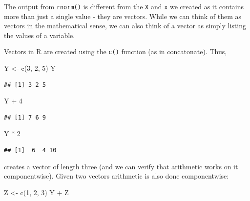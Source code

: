 \documentclass[
]{book}
\newenvironment{Shaded}{\begin{snugshade}}{\end{snugshade}}
\newcommand{\DecValTok}[1]{\textcolor[rgb]{0.00,0.00,0.81}{#1}}
\newcommand{\FunctionTok}[1]{\textcolor[rgb]{0.00,0.00,0.00}{#1}}
\newcommand{\NormalTok}[1]{#1}
\newcommand{\OtherTok}[1]{\textcolor[rgb]{0.56,0.35,0.01}{#1}}
\newcommand{\SpecialCharTok}[1]{\textcolor[rgb]{0.00,0.00,0.00}{#1}}
\begin{document}
The output from \texttt{rnorm()} is different from the \texttt{X} and \texttt{x} we created as it contains more than just a single value - they are vectors. While we can think of them as vectors in the mathematical sense, we can also think of a vector as simply listing the values of a variable.

Vectors in R are created using the \texttt{c()} function (as in concatonate). Thus,

\begin{Shaded}
\begin{Highlighting}[]
\NormalTok{Y }\OtherTok{\textless{}{-}} \FunctionTok{c}\NormalTok{(}\DecValTok{3}\NormalTok{, }\DecValTok{2}\NormalTok{, }\DecValTok{5}\NormalTok{)}
\NormalTok{Y}
\end{Highlighting}
\end{Shaded}

\begin{verbatim}
## [1] 3 2 5
\end{verbatim}

\begin{Shaded}
\begin{Highlighting}[]
\NormalTok{Y }\SpecialCharTok{+} \DecValTok{4}
\end{Highlighting}
\end{Shaded}

\begin{verbatim}
## [1] 7 6 9
\end{verbatim}

\begin{Shaded}
\begin{Highlighting}[]
\NormalTok{Y }\SpecialCharTok{*} \DecValTok{2}
\end{Highlighting}
\end{Shaded}

\begin{verbatim}
## [1]  6  4 10
\end{verbatim}

creates a vector of length three (and we can verify that arithmetic works on it componentwise). Given two vectors arithmetic is also done componentwise:

\begin{Shaded}
\begin{Highlighting}[]
\NormalTok{Z }\OtherTok{\textless{}{-}} \FunctionTok{c}\NormalTok{(}\DecValTok{1}\NormalTok{, }\DecValTok{2}\NormalTok{, }\DecValTok{3}\NormalTok{)}
\NormalTok{Y }\SpecialCharTok{+}\NormalTok{ Z}
\end{Highlighting}
\end{Shaded}
\end{document}

